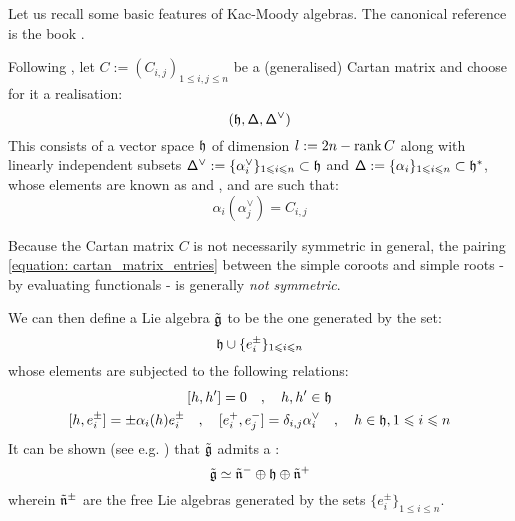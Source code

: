 Let us recall some basic features of Kac-Moody algebras. The canonical reference is the book \cite{kac_infinite_dimensional_lie_algebras}.

Following \cite[Chapter 1]{kac_infinite_dimensional_lie_algebras}, let $C := ( C_{i, j} )_{1 \leq i, j \leq n}$ be a (generalised) Cartan matrix and choose for it a realisation:
    $$(\mathfrak{h}, \mathsf{\Delta}, \mathsf{\Delta}^{\vee})$$
This consists of a vector space $\mathfrak{h}$ of dimension $l := 2n - \operatorname{rank} C$ along with linearly independent subsets $\mathsf{\Delta}^{\vee} := \{ \alpha_i^{\vee} \}_{1 \leqslant i \leqslant n} \subset \mathfrak{h}$ and $\mathsf{\Delta} := \{ \alpha_i \}_{1 \leqslant i \leqslant n} \subset \mathfrak{h}^*$, whose elements are known as  and , and are such that:
    \begin{equation} \label{equation: cartan_matrix_entries}
        \alpha_i( \alpha_j^{\vee} ) = C_{i, j}
    \end{equation}
\begin{remark}
    Because the Cartan matrix $C$ is not necessarily symmetric in general, the pairing \eqref{equation: cartan_matrix_entries} between the simple coroots and simple roots - by evaluating functionals - is generally \textit{not symmetric}.
\end{remark}

We can then define a Lie algebra $\tilde{\mathfrak{g}}$ to be the one generated by the set:
    \begin{equation} \label{equation: kac_moody_generators}
        \mathfrak{h} \cup \{ e_i^{\pm} \}_{1 \leqslant i \leqslant n}
    \end{equation}
whose elements are subjected to the following relations:
    \begin{equation} \label{equation: extended_kac_moody_relations}
        \begin{gathered}
            [h, h'] = 0 \quad, \quad h, h' \in \h
            \\
            [h, e_i^{\pm}] = \pm \alpha_i(h) e_i^{\pm} \quad, \quad [e_i^+, e_j^-] = \delta_{i, j} \alpha_i^{\vee} \quad, \quad h \in \h, 1 \leq i \leq n
        \end{gathered}
    \end{equation}
It can be shown (see e.g. \cite[Theorem 1.2]{kac_infinite_dimensional_lie_algebras}) that $\tilde{\mathfrak{g}}$ admits a :
    $$\tilde{\mathfrak{g}} \simeq \tilde{\mathfrak{n}}^- \oplus \mathfrak{h} \oplus \tilde{\mathfrak{n}}^+$$
wherein $\tilde{\mathfrak{n}}^{\pm}$ are the free Lie algebras generated by the sets $\{ e_i^{\pm} \}_{1 \leq i \leq n}$.
    
